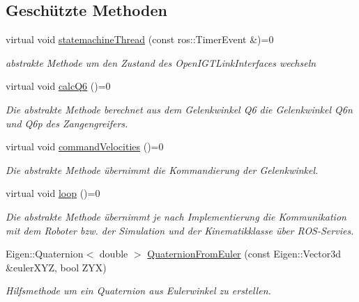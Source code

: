 \subsection*{Geschützte Methoden}
\begin{DoxyCompactItemize}
\item 
\hypertarget{classICommander_abcacd07f49f646d08e1722a1df08b8ce}{virtual void \hyperlink{classICommander_abcacd07f49f646d08e1722a1df08b8ce}{statemachine\-Thread} (const ros\-::\-Timer\-Event \&)=0}\label{classICommander_abcacd07f49f646d08e1722a1df08b8ce}

\begin{DoxyCompactList}\small\item\em abstrakte Methode um den Zustand des Open\-I\-G\-T\-Link\-Interfaces wechseln \end{DoxyCompactList}\item 
\hypertarget{classICommander_a1967688a309974862c4a81b5fe04c3eb}{virtual void \hyperlink{classICommander_a1967688a309974862c4a81b5fe04c3eb}{calc\-Q6} ()=0}\label{classICommander_a1967688a309974862c4a81b5fe04c3eb}

\begin{DoxyCompactList}\small\item\em Die abstrakte Methode berechnet aus dem Gelenkwinkel Q6 die Gelenkwinkel Q6n und Q6p des Zangengreifers. \end{DoxyCompactList}\item 
\hypertarget{classICommander_a43c10dd80f4815afd4058226450c7af3}{virtual void \hyperlink{classICommander_a43c10dd80f4815afd4058226450c7af3}{command\-Velocities} ()=0}\label{classICommander_a43c10dd80f4815afd4058226450c7af3}

\begin{DoxyCompactList}\small\item\em Die abstrakte Methode übernimmt die Kommandierung der Gelenkwinkel. \end{DoxyCompactList}\item 
\hypertarget{classICommander_aa5f882f46d3629fa754162a9ee11984c}{virtual void \hyperlink{classICommander_aa5f882f46d3629fa754162a9ee11984c}{loop} ()=0}\label{classICommander_aa5f882f46d3629fa754162a9ee11984c}

\begin{DoxyCompactList}\small\item\em Die abstrakte Methode übernimmt je nach Implementierung die Kommunikation mit dem Roboter bzw. der Simulation und der Kinematikklasse über R\-O\-S-\/\-Servies. \end{DoxyCompactList}\item 
Eigen\-::\-Quaternion$<$ double $>$ \hyperlink{classICommander_a3f9e89737d7d924553d2ed6704eb8af7}{Quaternion\-From\-Euler} (const Eigen\-::\-Vector3d \&euler\-X\-Y\-Z, bool Z\-Y\-X)
\begin{DoxyCompactList}\small\item\em Hilfsmethode um ein Quaternion aus Eulerwinkel zu erstellen. \end{DoxyCompactList}\end{DoxyCompactItemize}
